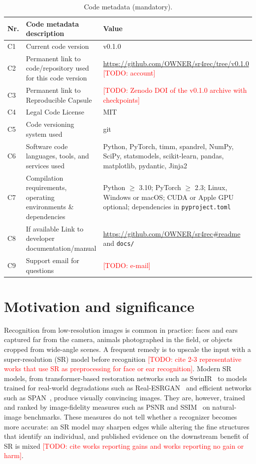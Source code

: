 \documentclass[preprint,12pt]{elsarticle}
\newcommand{\todo}[1]{\textcolor{red}{[TODO: #1]}}
\begin{document}
\begin{table}[H]
\centering
\footnotesize
\begin{tabular}{|l|p{5.4cm}|p{6.2cm}|}
\hline
\textbf{Nr.} & \textbf{Code metadata description} & \textbf{Value} \\
\hline
C1 & Current code version & v0.1.0 \\
\hline
C2 & Permanent link to code/repository used for this code version & \url{https://github.com/OWNER/sr4rec/tree/v0.1.0} \todo{account} \\
\hline
C3 & Permanent link to Reproducible Capsule & \todo{Zenodo DOI of the v0.1.0 archive with checkpoints} \\
\hline
C4 & Legal Code License & MIT \\
\hline
C5 & Code versioning system used & git \\
\hline
C6 & Software code languages, tools, and services used & Python, PyTorch, timm, spandrel, NumPy, SciPy, statsmodels, scikit-learn, pandas, matplotlib, pydantic, Jinja2 \\
\hline
C7 & Compilation requirements, operating environments \& dependencies & Python $\geq$ 3.10; PyTorch $\geq$ 2.3; Linux, Windows or macOS; CUDA or Apple GPU optional; dependencies in \texttt{pyproject.toml} \\
\hline
C8 & If available Link to developer documentation/manual & \url{https://github.com/OWNER/sr4rec\#readme} and \texttt{docs/} \\
\hline
C9 & Support email for questions & \todo{e-mail} \\
\hline
\end{tabular}
\caption{Code metadata (mandatory).}
\label{tab:metadata}
\end{table}

\linenumbers

\section{Motivation and significance}
\label{sec:motivation}

Recognition from low-resolution images is common in practice: faces and ears captured far from the
camera, animals photographed in the field, or objects cropped from wide-angle scenes. A frequent
remedy is to upscale the input with a super-resolution (SR) model before recognition
\todo{cite 2-3 representative works that use SR as preprocessing for face or ear recognition}.
Modern SR models, from transformer-based restoration networks such as SwinIR~\cite{liang2021swinir}
to models trained for real-world degradations such as Real-ESRGAN~\cite{wang2021realesrgan} and
efficient networks such as SPAN~\cite{wan2024span}, produce visually convincing images. They are,
however, trained and ranked by image-fidelity measures such as PSNR and SSIM~\cite{wang2004ssim} on
natural-image benchmarks. These measures do not tell whether a recognizer becomes more accurate:
an SR model may sharpen edges while altering the fine structures that identify an individual, and
published evidence on the downstream benefit of SR is mixed \todo{cite works reporting gains and works
reporting no gain or harm}.
\end{document}
